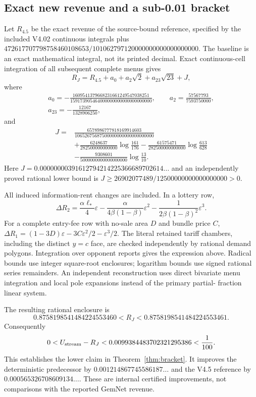 \subsection{Exact new revenue and a sub-0.01 bracket}\label{sec:joint-revenue}

Let $R_{4.5}$ be the exact revenue of the source-bound reference, specified
by the included V4.02 continuous integrals plus
$472617707798758460108653/101062797120000000000000000000$.
The baseline is an exact mathematical integral, not its printed decimal.
Exact continuous-cell integration of all subsequent complete menus gives
\begin{equation}\label{eq:joint-revenue}
R_J=R_{4.5}+a_0+a_2\sqrt2+a_{23}\sqrt{23}+J,
\end{equation}
where
\[
\begin{gathered}
a_0=-\frac{1609541379668231661249547038251}
              {159173905464000000000000000000000},\qquad
 a_2=\frac{57567793}{7593750000},\\
a_{23}=-\frac{12167}{1328906250},
\end{gathered}
\]
and
\[
\begin{split}
J={}&\frac{6578986777818169914603}{10652675687500000000000000000000}\\
&+\frac{6248637}{282500000000000}\log\frac{161}{176}
-\frac{61575471}{282500000000000}\log\frac{613}{628}\\
&-\frac{9308601}{5000000000000000000}\log\frac{13}{10}.
\end{split}
\]
Here $J=0.00000000391612794214225366689702614\ldots$ and an independently
proved rational lower bound is $J\ge26902077489/12500000000000000000>0$.

All induced information-rent changes are included. In a lottery row,
\[
\Delta R_2=\frac{\alpha\ell_*}{4}\varepsilon
-\frac{\alpha}{4\beta(1-\beta)}\varepsilon^2
-\frac{1}{2\beta(1-\beta)^2}\varepsilon^3.
\]
For a complete entry-fee row with no-sale area $D$ and bundle price $C$,
$\Delta R_1=(1-3D)\varepsilon-3C\varepsilon^2/2-\varepsilon^3/2$.
The literal retained tariff chambers, including the distinct $y=c$ face,
are checked independently by rational demand polygons. Integration over
opponent reports gives the expression above. Radical bounds use integer
square-root enclosures; logarithm bounds use signed rational series
remainders. An independent reconstruction uses direct bivariate menu
integration and local pole expansions instead of the primary partial-
fraction linear system.

The resulting rational enclosure is
\[
0.8758198541484224553460<R_J<0.8758198541484224553461.
\]
Consequently
\[
0<U_{\rm stream}-R_J<0.0099384483702321295386<\frac1{100}.
\]
This establishes the lower claim in Theorem~\ref{thm:bracket}. It improves
the deterministic predecessor by $0.001214867745586187\ldots$ and the
V4.5 reference by $0.000565326708609134\ldots$. These are internal certified
improvements, not comparisons with the reported GemNet revenue.
